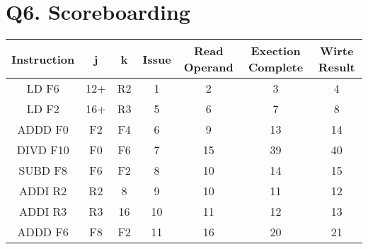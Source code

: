 \documentclass[12pt]{article}
\begin{document}
\section{Q6. Scoreboarding}
\begin{tabular}{|c|c|c|c|c|c|c|}
\hline 
Instruction & j & k & Issue & Read Operand & Exection Complete & Wirte Result \\ 
\hline 
LD F6 & 12+ & R2 & 1 & 2 & 3 & 4 \\ 
\hline 
LD F2 & 16+ & R3 & 5 & 6 & 7 & 8 \\ 
\hline 
ADDD F0 & F2 & F4 & 6 & 9 & 13 & 14 \\ 
\hline 
DIVD F10 & F0 & F6 & 7 & 15 & 39 & 40 \\ 
\hline 
SUBD F8 & F6 & F2 & 8 & 10 & 14 & 15 \\ 
\hline 
ADDI R2 & R2 & 8 & 9 & 10 & 11 & 12 \\ 
\hline 
ADDI R3 & R3 & 16 & 10 & 11 & 12 & 13 \\ 
\hline
ADDD F6 & F8 & F2 & 11 & 16 & 20 & 21 \\
\hline
\end{tabular} 
\end{document}
